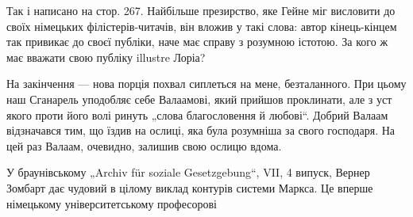 {Так і написано на стор. 267. Найбільше презирство, яке Гейне міг висловити до своїх німецьких філістерів-читачів, він вложив
у такі слова: автор кінець-кінцем так привикає до своєї публіки, наче має справу з розумною істотою. За кого ж має вважати
свою публіку illustre Лоріа?

На закінчення — нова порція похвал сиплеться на мене, безталанного. При цьому наш Сганарель уподобляє себе Валаамові, який
прийшов проклинати, але з уст якого проти його волі ринуть „слова благословення й любові“. Добрий Валаам відзначався тим, що
їздив на ослиці, яка була розумніша за свого господаря. На цей раз Валаам, очевидно, залишив свою ослицю вдома.}

У браунівському „Archiv für soziale Gesetzgebung“, VII, 4 випуск, Вернер Зомбарт дає чудовий в цілому виклад контурів
системи Маркса. Це вперше німецькому університетському професорові
\parbreak{}  %

